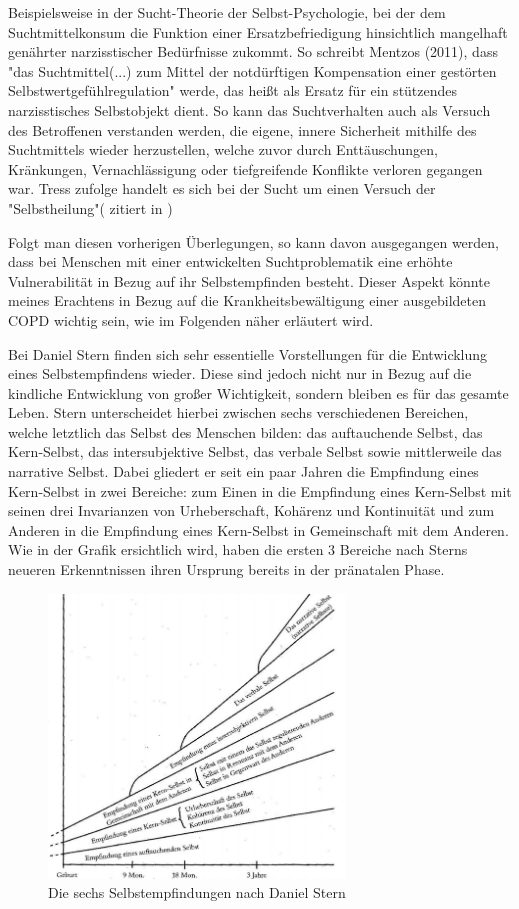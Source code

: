 Beispielsweise in der Sucht-Theorie der Selbst-Psychologie, bei der dem Suchtmittelkonsum die Funktion einer Ersatzbefriedigung hinsichtlich mangelhaft genährter narzisstischer Bedürfnisse zukommt. So schreibt Mentzos (2011), dass "das Suchtmittel(...) zum Mittel der notdürftigen Kompensation einer gestörten Selbstwertgefühlregulation" werde, das heißt als Ersatz für ein stützendes narzisstisches Selbstobjekt dient. So kann das Suchtverhalten auch als Versuch des Betroffenen verstanden werden, die eigene, innere Sicherheit mithilfe des Suchtmittels wieder herzustellen, welche zuvor durch Enttäuschungen, Kränkungen, Vernachlässigung oder tiefgreifende Konflikte verloren gegangen war. Tress zufolge handelt es sich bei der Sucht um einen Versuch der "Selbstheilung"(\cite{tress1985} zitiert in \cite[222]{ermann1999})

Folgt man diesen vorherigen Überlegungen, so kann davon ausgegangen werden, dass bei Menschen mit einer entwickelten Suchtproblematik eine erhöhte Vulnerabilität in Bezug auf ihr Selbstempfinden besteht. Dieser Aspekt könnte meines Erachtens in Bezug auf die Krankheitsbewältigung einer ausgebildeten COPD wichtig sein, wie im Folgenden näher erläutert wird.

Bei Daniel Stern finden sich sehr essentielle Vorstellungen für die Entwicklung eines Selbstempfindens wieder. Diese sind jedoch nicht nur in Bezug auf die kindliche Entwicklung von großer Wichtigkeit, sondern bleiben es für das gesamte Leben. Stern unterscheidet hierbei zwischen sechs verschiedenen Bereichen, welche letztlich das Selbst des Menschen bilden: das auftauchende Selbst, das Kern-Selbst, das intersubjektive Selbst, das verbale Selbst sowie mittlerweile das narrative Selbst. Dabei gliedert er seit ein paar Jahren die Empfindung eines Kern-Selbst in zwei Bereiche: zum Einen in die Empfindung eines Kern-Selbst mit seinen drei Invarianzen von Urheberschaft, Kohärenz und Kontinuität und zum Anderen in die Empfindung eines Kern-Selbst in Gemeinschaft mit dem Anderen.  Wie in der Grafik ersichtlich wird, haben die ersten 3 Bereiche nach Sterns neueren Erkenntnissen ihren Ursprung bereits in der pränatalen Phase.


\begin{figure}
 \centering
  \includegraphics[width=0.7\textwidth]{selbstempfindungen}
  \caption{Die sechs Selbstempfindungen nach Daniel Stern}
  \label{fig:selbstempfindungen}
\end{figure}

